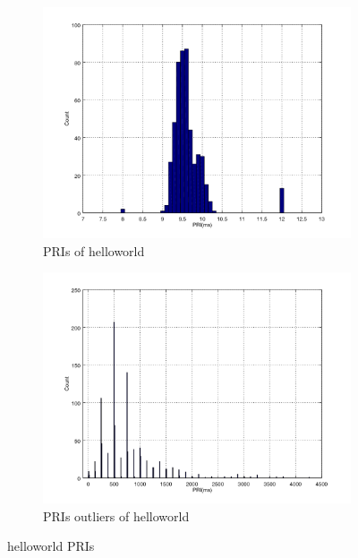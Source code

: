 \documentclass{article}
\begin{document}
\begin{figure}[!h]
	\centering
	\begin{subfigure}{0.45\textwidth}
		\includegraphics[width=\textwidth]{fig/helloworld_cc2538.png}
		\caption{PRIs of helloworld\label{HelloworldPriNormal}}
	\end{subfigure}
	\begin{subfigure}{0.45\textwidth}
		\includegraphics[width=\textwidth]{fig/helloworld_cc2538_outlier.png}
		\caption{PRIs outliers of helloworld\label{HelloworldPriOutliers}}
	\end{subfigure}
	\caption{helloworld PRIs\label{HelloworldPri}}
\end{figure}
\end{document}
